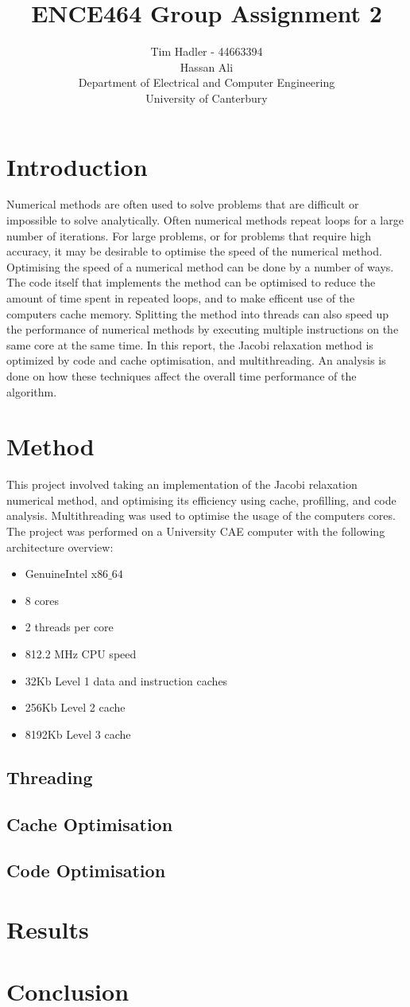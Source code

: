 \documentclass[a4paper, 12pt]{article}
\title{\vspace{-1cm} ENCE464 Group Assignment 2}
\author{Tim Hadler - 44663394 \\ Hassan Ali \\
	\small Department of Electrical and Computer Engineering\\
	\small University of Canterbury}
\begin{document}
\maketitle
\pagebreak
	
\section{Introduction}
	Numerical methods are often used to solve problems that are difficult or impossible to solve analytically. Often numerical methods repeat loops for a large number of iterations. For large problems, or for problems that require high accuracy, it may be desirable to optimise the speed of the numerical method. Optimising the speed of a numerical method can be done by a number of ways. The code itself that implements the method can be optimised to reduce the amount of time spent in repeated loops, and to make efficent use of the computers cache memory. Splitting the method into threads can also speed up the performance of numerical methods by executing multiple instructions on the same core at the same time. In this report, the Jacobi relaxation method is optimized by code and cache optimisation, and multithreading. An analysis is done on how these techniques affect the overall time performance of the algorithm. 


\section{Method}
	This project involved taking an implementation of the Jacobi relaxation numerical method, and optimising its efficiency using cache, profilling, and code analysis. Multithreading was used to optimise the usage of the computers cores. 
	\\
	The project was performed on a University CAE computer with the following architecture overview:
	\begin{itemize}
		\item GenuineIntel x$86\_64$
		\item 8 cores
		\item 2 threads per core
		\item 812.2 MHz CPU speed
		\item 32Kb Level 1 data and instruction caches
		\item 256Kb Level 2 cache
		\item 8192Kb Level 3 cache
	\end{itemize}

\subsection{Threading}
	

\subsection{Cache Optimisation}

\subsection{Code Optimisation}


\section{Results}
	
	
\section{Conclusion}
	
\end{document}
